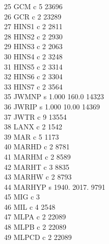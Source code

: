 \documentclass[12pt]{article}
\begin{document}
      25  GCM        c                                  5     23696\\
      26  GCR        c                                  2     23289\\
      27  HINS1      c                                  2      2811\\
      28  HINS2      c                                  2      2930\\
      29  HINS3      c                                  2      2063\\
      30  HINS4      c                                  2      3248\\
      31  HINS5      c                                  2      3314\\
      32  HINS6      c                                  2      3304\\
      33  HINS7      c                                  2      3564\\
      35  JWMNP      s    1.000        160.0                  14323\\
      36  JWRIP      s    1.000        10.00                  14369\\
      37  JWTR       c                                  9     13554\\
      38  LANX       c                                  2      1542\\
      39  MAR        c                                  5      1173\\
      40  MARHD      c                                  2      8781\\
      41  MARHM      c                                  2      8589\\
      42  MARHT      c                                  3      8835\\
      43  MARHW      c                                  2      8793\\
      44  MARHYP     s    1940.        2017.                   9791\\
      45  MIG        c                                  3\\
      46  MIL        c                                  4      2548\\
      47  MLPA       c                                  2     22089\\
      48  MLPB       c                                  2     22089\\
      49  MLPCD      c                                  2     22089\\
\end{document}
